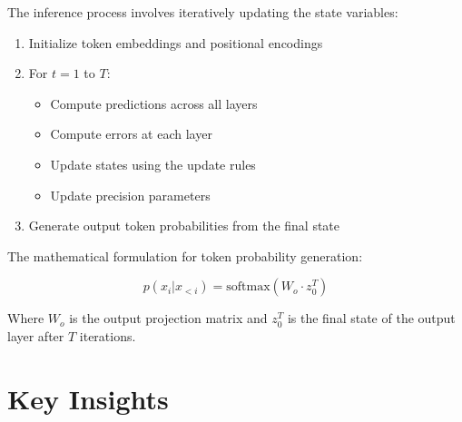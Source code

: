 \documentclass{article}
\begin{document}
The inference process involves iteratively updating the state variables:

\begin{enumerate}
  \item Initialize token embeddings and positional encodings
  \item For $t = 1$ to $T$:
  \begin{itemize}
    \item Compute predictions across all layers
    \item Compute errors at each layer
    \item Update states using the update rules
    \item Update precision parameters
  \end{itemize}
  \item Generate output token probabilities from the final state
\end{enumerate}

The mathematical formulation for token probability generation:

\begin{equation}
  p(x_i | x_{<i}) = \text{softmax}(W_o \cdot z_0^T)
\end{equation}

Where $W_o$ is the output projection matrix and $z_0^T$ is the final state of the output layer after $T$ iterations.

\section{Key Insights}
\end{document}
